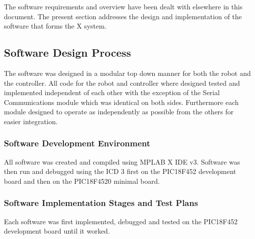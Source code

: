 \documentclass{article}
\begin{document}
The software requirements and overview have been dealt with elsewhere in this document. The present section addresses the design and implementation of the software that forms the X system.
\subsection{Software Design Process}
The software was designed in a modular top down manner for both the robot and the controller. All code for the robot and controller where designed tested and implemented independent of each other with the exception of the Serial Communications module which was identical on both sides. Furthermore each module designed to operate as independently as possible from the others for easier integration.
\subsubsection{Software Development Environment}
All software was created and compiled using MPLAB X IDE v3.
Software was then run and debugged using  the ICD 3 first on the PIC18F452 development board and then on the PIC18F4520 minimal board.
\subsubsection{Software Implementation Stages and Test Plans}
Each software was first implemented, debugged and tested on the PIC18F452 development board until it worked.
\end{document}
